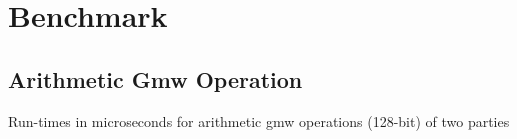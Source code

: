 \chapter{Benchmark}
\label{cha:benchmark}



\section{Arithmetic Gmw Operation}
\begin{table}[H]
	\centering
	\caption[Run-times in microseconds for arithmetic gmw operations (128-bit) of two parties]{Run-times in microseconds for arithmetic gmw operations (128-bit) of two parties}
	\label{tab:table_ex}
\end{table} 
\FloatBarrier

